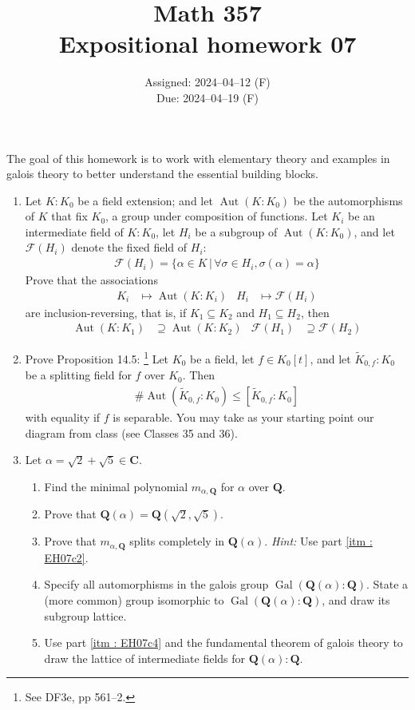 \documentclass[oneside, english, 11pt]{article}
\title{Math 357\\Expositional homework 07}
\author{}
\date{Assigned: 2024--04--12 (F)\\\hspace{9.7mm}Due: 2024--04--19 (F)}
\newcommand{\fontField}[1]{\mathbf{#1}}
\newcommand{\fontHint}[1]{\emph{Hint:} #1}
\newcommand{\Aut}{\automorphisms}
\DeclareMathOperator{\automorphisms}{Aut}
\newcommand{\C}{\complexes}
\newcommand{\complexes}{\fontField{C}}
\newcommand{\fixedField}{\mathcal{F}}
\newcommand{\Gal}{\galoisGroup}
\DeclareMathOperator{\galoisGroup}{Gal}
\newcommand{\Q}{\rationals}
\newcommand{\rationals}{\fontField{Q}}
\newcommand{\st}{{\, | \,}}
\begin{document}
\maketitle

The goal of this homework is to work with elementary theory and examples in galois theory to better understand the essential building blocks.

\begin{enumerate}[label=(\alph*)]
\item\label{itm : EH07a} Let $K : K_{0}$ be a field extension; and let $\Aut(K : K_{0})$ be the automorphisms of $K$ that fix $K_{0}$, a group under composition of functions. Let $K_{i}$ be an intermediate field of $K : K_{0}$, let $H_{i}$ be a subgroup of $\Aut(K : K_{0})$, and let $\fixedField(H_{i})$ denote the fixed field of $H_{i}$:
\begin{align*}
\fixedField(H_{i})
=
\{\alpha \in K \st \forall \sigma \in H_{i}, \sigma(\alpha) = \alpha\}
\end{align*}
Prove that the associations
\begin{align*}
K_{i}
&\mapsto
\Aut(K : K_{i})
&
H_{i}
&\mapsto
\fixedField(H_{i})
\end{align*}
are inclusion-reversing, that is, if $K_{1} \subseteq K_{2}$ and $H_{1} \subseteq H_{2}$, then
\begin{align*}
\Aut(K : K_{1})
&\supseteq
\Aut(K : K_{2})
&
\fixedField(H_{1})
&\supseteq
\fixedField(H_{2})
\end{align*}
\item\label{itm : EH07b} Prove Proposition 14.5:%
\footnote{See DF3e, pp 561--2.} %
Let $K_{0}$ be a field, let $f \in K_{0}[t]$, and let $\tilde{K}_{0, f} : K_{0}$ be a splitting field for $f$ over $K_{0}$. Then
\begin{align*}
\# \Aut(\tilde{K}_{0, f} : K_{0})
\leq
[\tilde{K}_{0, f} : K_{0}]
\end{align*}
with equality if $f$ is separable. You may take as your starting point our diagram from class (see Classes 35 and 36).
\item\label{itm : EH07c} Let $\alpha = \sqrt{2} + \sqrt{5} \in \C$.
\begin{enumerate}[label=(\roman*)]
\item\label{itm : EH07c1} Find the minimal polynomial $m_{\alpha, \Q}$ for $\alpha$ over $\Q$.
\item\label{itm : EH07c2} Prove that $\Q(\alpha) = \Q(\sqrt{2}, \sqrt{5})$.
\item\label{itm : EH07c3} Prove that $m_{\alpha, \Q}$ splits completely in $\Q(\alpha)$. \fontHint{Use part \ref{itm : EH07c2}.}
\item\label{itm : EH07c4} Specify all automorphisms in the galois group $\Gal(\Q(\alpha) : \Q)$. State a (more common) group isomorphic to $\Gal(\Q(\alpha) : \Q)$, and draw its subgroup lattice.
\item\label{itm : EH07c5} Use part \ref{itm : EH07c4} and the fundamental theorem of galois theory to draw the lattice of intermediate fields for $\Q(\alpha) : \Q$.
\end{enumerate}
\end{enumerate}
\end{document}
